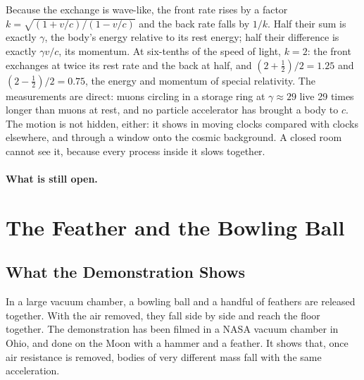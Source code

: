 \documentclass[11pt,a4paper]{article}
\begin{document}
Because the exchange is wave-like, the front rate rises by a factor $k=\sqrt{(1+v/c)/(1-v/c)}$ and the back rate falls by $1/k$. Half their sum is exactly $\gamma$, the body's energy relative to its rest energy; half their difference is exactly $\gamma v/c$, its momentum. At six-tenths of the speed of light, $k=2$: the front exchanges at twice its rest rate and the back at half, and $(2+\tfrac12)/2 = 1.25$ and $(2-\tfrac12)/2 = 0.75$, the energy and momentum of special relativity.   The measurements are direct: muons circling in a storage ring at $\gamma \approx 29$ live 29 times longer than muons at rest, and no particle accelerator has brought a body to $c$. The motion is not hidden, either: it shows in moving clocks compared with clocks elsewhere, and through a window onto the cosmic background. A closed room cannot see it, because every process inside it slows together.

\paragraph{What is still open.} 

\FloatBarrier
\section{The Feather and the Bowling Ball}
\label{sec:feather}

\subsection*{What the Demonstration Shows}

In a large vacuum chamber, a bowling ball and a handful of feathers are released together. With the air removed, they fall side by side and reach the floor together. The demonstration has been filmed in a NASA vacuum chamber in Ohio, and done on the Moon with a hammer and a feather. It shows that, once air resistance is removed, bodies of very different mass fall with the same acceleration.
\end{document}
